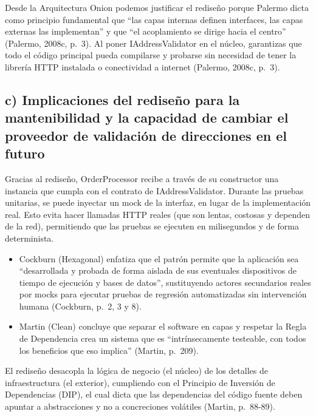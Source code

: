 \documentclass[12pt,a4paper]{article}
\begin{document}
Desde la Arquitectura Onion podemos justificar el rediseño porque Palermo dicta como principio fundamental que ``las capas internas definen interfaces, las capas externas las implementan'' y que ``el acoplamiento se dirige hacia el centro'' (Palermo, 2008c, p.~3). Al poner IAddressValidator en el núcleo, garantizas que todo el código principal pueda compilarse y probarse sin necesidad de tener la librería HTTP instalada o conectividad a internet (Palermo, 2008c, p.~3).

\subsection{c) Implicaciones del rediseño para la mantenibilidad y la capacidad de cambiar el proveedor de validación de direcciones en el futuro}

Gracias al rediseño, OrderProcessor recibe a través de su constructor una instancia que cumpla con el contrato de IAddressValidator. Durante las pruebas unitarias, se puede inyectar un mock de la interfaz, en lugar de la implementación real. Esto evita hacer llamadas HTTP reales (que son lentas, costosas y dependen de la red), permitiendo que las pruebas se ejecuten en milisegundos y de forma determinista.

\begin{itemize}[label=$\cdot$]
  \item Cockburn (Hexagonal) enfatiza que el patrón permite que la aplicación sea ``desarrollada y probada de forma aislada de sus eventuales dispositivos de tiempo de ejecución y bases de datos'', sustituyendo actores secundarios reales por mocks para ejecutar pruebas de regresión automatizadas sin intervención humana (Cockburn, p.~2, 3 y 8).
  \item Martin (Clean) concluye que separar el software en capas y respetar la Regla de Dependencia crea un sistema que es ``intrínsecamente testeable, con todos los beneficios que eso implica'' (Martin, p.~209).
\end{itemize}

El rediseño desacopla la lógica de negocio (el núcleo) de los detalles de infraestructura (el exterior), cumpliendo con el Principio de Inversión de Dependencias (DIP), el cual dicta que las dependencias del código fuente deben apuntar a abstracciones y no a concreciones volátiles (Martin, p.~88-89).
\end{document}
